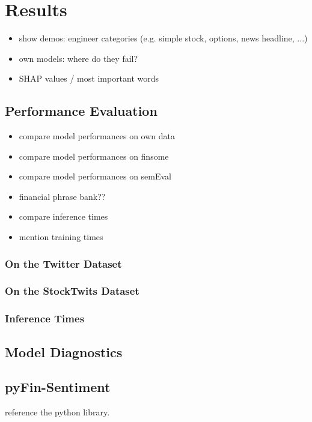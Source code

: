 \section{Results}


\begin{itemize}[noitemsep]
	\item show demos: engineer categories (e.g. simple stock, options, news headline, ...) 
	\item own models: where do they fail?
	\item SHAP values / most important words
\end{itemize}



\subsection{Performance Evaluation}

\begin{itemize}[noitemsep]
	\item compare model performances on own data
	\item compare model performances on finsome
	\item compare model performances on semEval
	\item financial phrase bank??
	\item compare inference times
	\item mention training times
\end{itemize}

\subsubsection{On the Twitter Dataset}
\subsubsection{On the StockTwits Dataset}
\subsubsection{Inference Times}


\subsection{Model Diagnostics}

\subsection{pyFin-Sentiment}
reference the python library.
